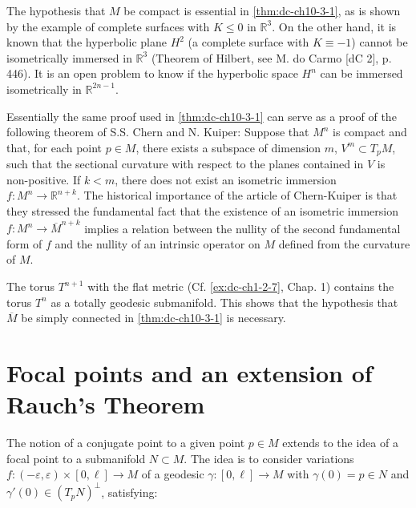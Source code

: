 \begin{remark}[Remark 3.6]
  \label{rem:dc-ch10-3-6}
  The hypothesis that $M$ be compact is essential in \cref{thm:dc-ch10-3-1}, as is shown by
  the example of complete surfaces with $K\leq 0$ in $\mathbb{R}^3$. On the other
  hand, it is known that the hyperbolic plane $H^2$ (a complete surface with
  $K\equiv -1$) cannot be isometrically immersed in $\mathbb{R}^3$ (Theorem of
  Hilbert, see M. do Carmo [dC 2], p. 446). It is an open problem to know if the
  hyperbolic space $H^n$ can be immersed isometrically in $\mathbb{R}^{2n-1}$.
\end{remark}

\begin{remark}[Remark 3.7]
  \label{rem:dc-ch10-3-7}
  Essentially the same proof used in \cref{thm:dc-ch10-3-1} can serve as a proof of the
  following theorem of S.S. Chern and N. Kuiper: Suppose that $M^n$ is compact and
  that, for each point $p\in M$, there exists a subspace of dimension $m$,
  $V^m\subset T_pM$, such that the sectional curvature with respect to the planes
  contained in $V$ is non-positive. If $k<m$, there does not exist an isometric
  immersion $f:M^n\to\mathbb{R}^{n+k}$. The historical importance of the article of
  Chern-Kuiper is that they stressed the fundamental fact that the existence of an
  isometric immersion $f:M^n\to\overline{M}^{n+k}$ implies a relation between the
  nullity of the second fundamental form of $f$ and the nullity of an intrinsic
  operator on $M$ defined from the curvature of $M$.
\end{remark}

\begin{remark}[Remark 3.8]
  \label{rem:dc-ch10-3-8}
  The torus $T^{n+1}$ with the flat metric (Cf. \cref{ex:dc-ch1-2-7}, Chap. 1) contains the
  torus $T^n$ as a totally geodesic submanifold. This shows that the hypothesis
  that $\overline{M}$ be simply connected in \cref{thm:dc-ch10-3-1} is necessary.
\end{remark}

\section{Focal points and an extension of Rauch's Theorem}

The notion of a conjugate point to a given point $p\in M$ extends to the idea of a
focal point to a submanifold $N\subset M$. The idea is to consider variations
$f:(-\varepsilon,\varepsilon)\times[0,\ell]\to M$ of a geodesic
$\gamma:[0,\ell]\to M$ with $\gamma(0)=p\in N$ and $\gamma'(0)\in(T_pN)^\perp$,
satisfying:


